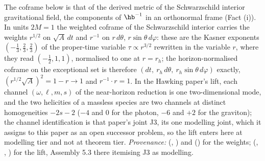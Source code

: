 The coframe below is that of the derived metric of the Schwarzschild interior gravitational field, the components of $\hb^{-1}$ in an orthonormal frame (Fact (i)). In units $2M = 1$ the weighted coframe of the Schwarzschild interior carries the weights $r^{1/2}$ on $\sqrt{A}\,dt$ and $r^{-1}$ on $r\,d\theta$, $r\sin\theta\,d\varphi$: these are the Kasner exponents $(-\tfrac13, \tfrac23, \tfrac23)$ of the proper-time variable $\tau \propto r^{3/2}$ rewritten in the variable $r$, where they read $(-\tfrac12, 1, 1)$, normalised to one at $r = r_h$; the horizon-normalised coframe on the exceptional set is therefore $(dt,\ r_h\,d\theta,\ r_h\sin\theta\,d\varphi)$ exactly, $(r^{1/2}\sqrt{A})^2 = 1 - r \to 1$ and $r^{-1}\cdot r = 1$. In the Hawking paper's lift, each channel $(\omega, \ell, m, s)$ of the near-horizon reduction is one two-dimensional mode, and the two helicities of a massless species are two channels at distinct homogeneities $-2s - 2$ ($-4$ and $0$ for the photon, $-6$ and $+2$ for the graviton); the channel identification is that paper's joint J3, its one modelling joint, which it assigns to this paper as an open successor problem, so the lift enters here at modelling tier and not at theorem tier. \emph{Provenance:} \cite[Lemmas 5.1 to 5.3, Def.~5.5]{ButlerT6} (, ) and \cite[Thm.~8.16]{ButlerT4} () for the weights; \cite[Fact~5.1, Prop.~5.2, Assembly~5.3]{ButlerT7} (, , ) for the lift, Assembly 5.3 there itemising J3 as modelling.
